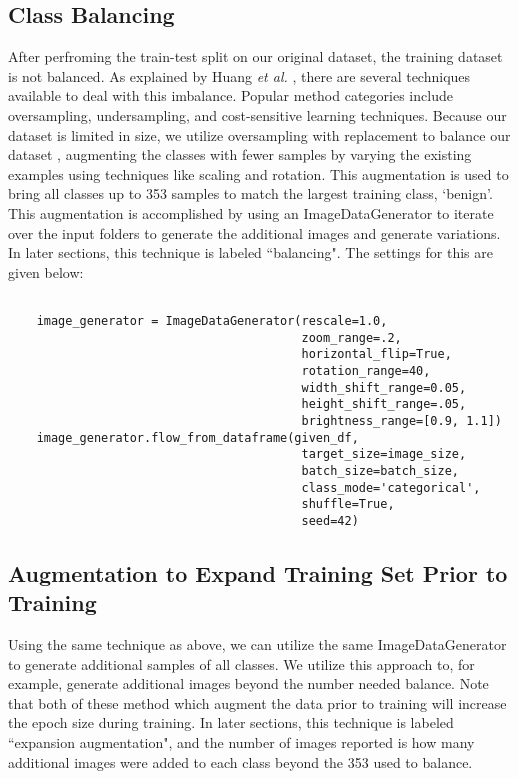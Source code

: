 \documentclass[sn-mathphys,Numbered]{sn-jnl}%
\theoremstyle{thmstyleone}%
\theoremstyle{thmstyletwo}%
\theoremstyle{thmstylethree}%
\begin{document}
\subsection{Class Balancing}
After perfroming the train-test split on our original dataset, the training dataset is not balanced.  
As explained by Huang {\it et al.} \cite{Huang_2016_CVPR}, there are several techniques available to deal with this imbalance.  Popular method categories include oversampling, undersampling, and cost-sensitive learning techniques.  Because our dataset is limited in size, we utilize oversampling with replacement to balance our dataset \cite{Huang_2016_CVPR}, augmenting the classes with fewer samples \cite{tensorflow-imagedatagenerator} by varying the existing examples using techniques like scaling and rotation.  This augmentation is used to bring all classes up to 353 samples to match the largest training class, `benign'.  This augmentation is accomplished by using an ImageDataGenerator \cite{tensorflow-imagedatagenerator} to iterate over the input folders to generate the additional images and generate variations.  In later sections, this technique is labeled ``balancing".  The settings for this are given below:
\begin{lstlisting}

    image_generator = ImageDataGenerator(rescale=1.0,
                                         zoom_range=.2,
                                         horizontal_flip=True,
                                         rotation_range=40,
                                         width_shift_range=0.05,
                                         height_shift_range=.05,
                                         brightness_range=[0.9, 1.1])
    image_generator.flow_from_dataframe(given_df,
                                         target_size=image_size,
                                         batch_size=batch_size,
                                         class_mode='categorical',
                                         shuffle=True,
                                         seed=42)
\end{lstlisting}

\subsection{Augmentation to Expand Training Set Prior to Training}
Using the same technique as above, we can utilize the same ImageDataGenerator to generate additional samples of all classes.  We utilize this approach to, for example, generate additional images beyond the number needed balance.  Note that both of these method which augment the data prior to training will increase the epoch size during training.   In later sections, this technique is labeled ``expansion augmentation", and the number of images reported is how many additional images were added to each class beyond the 353 used to balance. 
\end{document}
